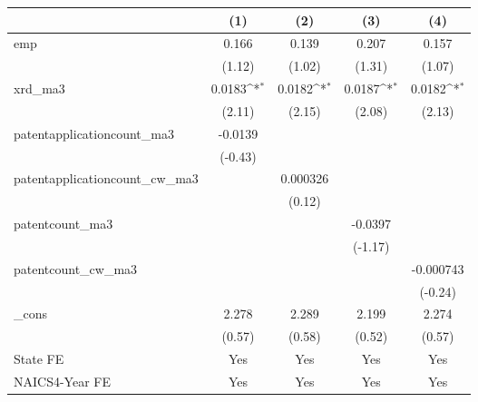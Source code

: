 {
\def\sym#1{\ifmmode^{#1}\else\(^{#1}\)\fi}
\begin{tabular}{l*{4}{c}}
\hline\hline
            &\multicolumn{1}{c}{(1)}         &\multicolumn{1}{c}{(2)}         &\multicolumn{1}{c}{(3)}         &\multicolumn{1}{c}{(4)}         \\
\hline
emp         &       0.166         &       0.139         &       0.207         &       0.157         \\
            &      (1.12)         &      (1.02)         &      (1.31)         &      (1.07)         \\
[1em]
xrd\_ma3     &      0.0183\sym{*}  &      0.0182\sym{*}  &      0.0187\sym{*}  &      0.0182\sym{*}  \\
            &      (2.11)         &      (2.15)         &      (2.08)         &      (2.13)         \\
[1em]
patentapplicationcount\_ma3&     -0.0139         &                     &                     &                     \\
            &     (-0.43)         &                     &                     &                     \\
[1em]
patentapplicationcount\_cw\_ma3&                     &    0.000326         &                     &                     \\
            &                     &      (0.12)         &                     &                     \\
[1em]
patentcount\_ma3&                     &                     &     -0.0397         &                     \\
            &                     &                     &     (-1.17)         &                     \\
[1em]
patentcount\_cw\_ma3&                     &                     &                     &   -0.000743         \\
            &                     &                     &                     &     (-0.24)         \\
[1em]
\_cons      &       2.278         &       2.289         &       2.199         &       2.274         \\
            &      (0.57)         &      (0.58)         &      (0.52)         &      (0.57)         \\
[1em]
State FE    &         Yes         &         Yes         &         Yes         &         Yes         \\
[1em]
NAICS4-Year FE&         Yes         &         Yes         &         Yes         &         Yes         \\

\end{tabular}}
